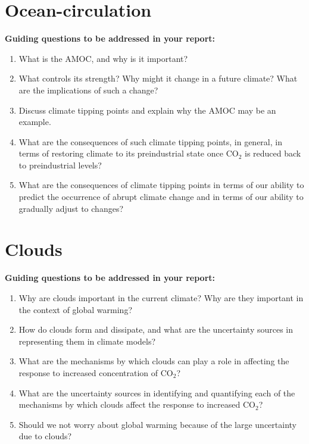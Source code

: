 \documentclass[12pt]{article}
\begin{document}
\section*{Ocean-circulation}
  \textbf{Guiding questions to be addressed in your report:}
    \begin{enumerate}
    \item What is the AMOC, and why is it important?
    \item What controls its strength? Why might it change in a future climate? What are the implications of such a change?
    \item Discuss climate tipping points and explain why the AMOC may be an example.
    \item What are the consequences of such climate tipping points, in general, in terms of restoring climate to its preindustrial state once CO$_2$ is reduced back to preindustrial levels?
    \item What are the consequences of climate tipping points in terms of our ability to predict the occurrence of abrupt climate change and in terms of our ability to gradually adjust to changes?
    \end{enumerate}

\section*{Clouds}
  \textbf{Guiding questions to be addressed in your report:}
    \begin{enumerate}
    \item Why are clouds important in the current climate? Why are they important in the context of global warming?
    \item How do clouds form and dissipate, and what are the uncertainty sources in representing them in climate models?
    \item What are the mechanisms by which clouds can play a role in affecting the response to increased concentration of CO$_2$?
    \item What are the uncertainty sources in identifying and quantifying each of the mechanisms by which clouds affect the response to increased CO$_2$?
    \item Should we not worry about global warming because of the large uncertainty due to clouds?
    \end{enumerate}
\end{document}
